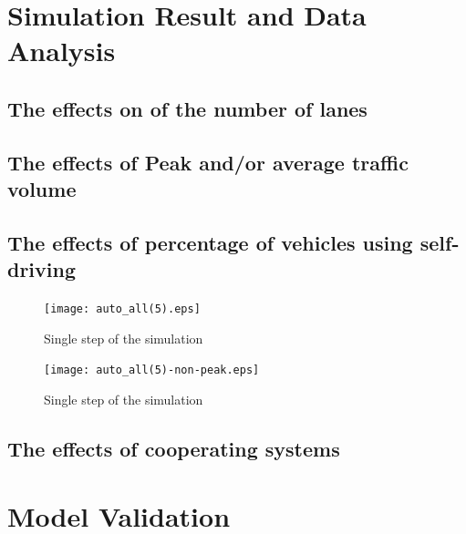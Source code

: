 \documentclass{mcmthesis}
\begin{document}
\section{Simulation Result and Data Analysis}
\subsection{The effects on of the number of lanes}
\label{lanes}

\subsection{The effects of Peak and/or average traffic volume}

\subsection{The effects of percentage of vehicles using self-driving}
\begin{figure}[H]
	\centerline{\texttt{[image: auto\_all(5).eps]}}
	\caption{Single step of the simulation}
\end{figure}

\begin{figure}[H]
	\centerline{\texttt{[image: auto\_all(5)-non-peak.eps]}}
	\caption{Single step of the simulation}
\end{figure}

\subsection{The effects of cooperating systems}

\section{Model Validation}
\end{document}
